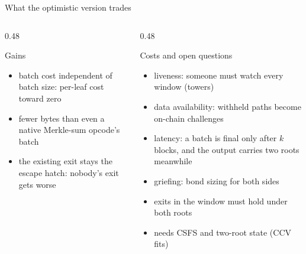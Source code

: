 \documentclass[aspectratio=169,10pt]{beamer}
\begin{document}
\begin{frame}{What the optimistic version trades}
  \begin{columns}[T]
    \begin{column}{0.48\textwidth}
      \begin{block}{Gains}
        \begin{itemize}
          \item batch cost independent of batch size: per-leaf cost toward zero
          \item fewer bytes than even a native Merkle-sum opcode's batch
          \item the existing exit stays the escape hatch: nobody's exit gets worse
        \end{itemize}
      \end{block}
    \end{column}
    \begin{column}{0.48\textwidth}
      \begin{block}{Costs and open questions}
        \begin{itemize}
          \item liveness: someone must watch every window (towers)
          \item data availability: withheld paths become on-chain challenges
          \item latency: a batch is final only after $k$ blocks, and the output carries two roots meanwhile
          \item griefing: bond sizing for both sides
          \item exits in the window must hold under both roots
          \item needs CSFS and two-root state (CCV fits)
        \end{itemize}
      \end{block}
    \end{column}
  \end{columns}
\end{frame}
\end{document}
